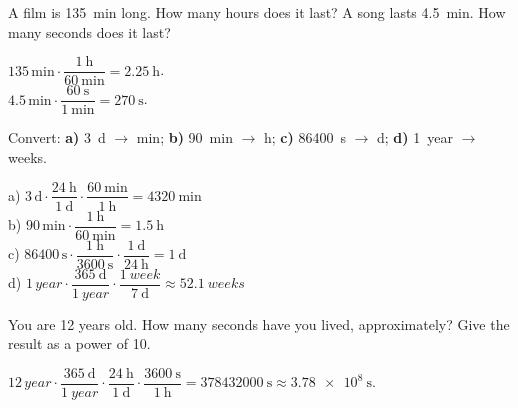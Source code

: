 \begin{exercise}
    A film is \qty{135}{\minute} long. How many hours does it last? A song lasts \qty{4.5}{\minute}. How many seconds does it last?
    \begin{solu}
        \(\num{135}\,\unit{\minute} \cdot \dfrac{\qty{1}{\hour}}{\qty{60}{\minute}} = \qty{2.25}{\hour}\). \\
        \(\num{4.5}\,\unit{\minute} \cdot \dfrac{\qty{60}{\s}}{\qty{1}{\minute}} = \qty{270}{\s}\).
    \end{solu}
\end{exercise}

\begin{exercise}
    Convert: \textbf{a)} \qty{3}{\day} \(\to\) \unit{\minute}; \textbf{b)} \qty{90}{\minute} \(\to\) \unit{\hour}; \textbf{c)} \qty{86400}{\s} \(\to\) \unit{\day}; \textbf{d)} \qty{1}{year} \(\to\) weeks.
    \begin{solu}
        a) \(\num{3}\,\unit{\day} \cdot \dfrac{\qty{24}{\hour}}{\qty{1}{\day}} \cdot \dfrac{\qty{60}{\minute}}{\qty{1}{\hour}} = \qty{4320}{\minute}\) \\
        b) \(\num{90}\,\unit{\minute} \cdot \dfrac{\qty{1}{\hour}}{\qty{60}{\minute}} = \qty{1.5}{\hour}\) \\
        c) \(\num{86400}\,\unit{\s} \cdot \dfrac{\qty{1}{\hour}}{\qty{3600}{\s}} \cdot \dfrac{\qty{1}{\day}}{\qty{24}{\hour}} = \qty{1}{\day}\) \\
        d) \(\num{1}\,\unit{year} \cdot \dfrac{\qty{365}{\day}}{\qty{1}{year}} \cdot \dfrac{\qty{1}{week}}{\qty{7}{\day}} \approx \qty{52.1}{weeks}\)
    \end{solu}
\end{exercise}

\begin{exercise}
    You are 12 years old. How many seconds have you lived, approximately? Give the result as a power of 10.
    \begin{solu}
        \(\num{12}\,\unit{year} \cdot \dfrac{\qty{365}{\day}}{\qty{1}{year}} \cdot \dfrac{\qty{24}{\hour}}{\qty{1}{\day}} \cdot \dfrac{\qty{3600}{\s}}{\qty{1}{\hour}} = \qty{378432000}{\s} \approx \qty{3.78e8}{\s}\).
    \end{solu}
\end{exercise}

